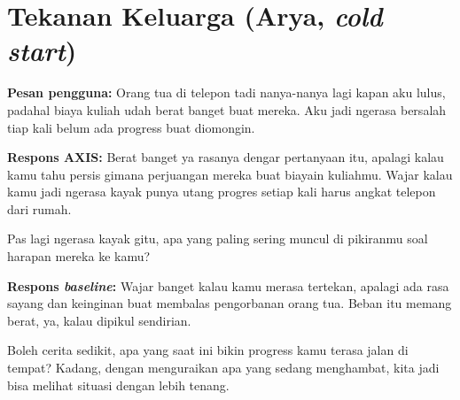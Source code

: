 \section{Tekanan Keluarga (Arya, \textit{cold start})}

\textbf{Pesan pengguna:} Orang tua di telepon tadi nanya-nanya lagi kapan aku lulus, padahal biaya kuliah udah berat banget buat mereka. Aku jadi ngerasa bersalah tiap kali belum ada progress buat diomongin.

\textbf{Respons AXIS:} Berat banget ya rasanya dengar pertanyaan itu, apalagi kalau kamu tahu persis gimana perjuangan mereka buat biayain kuliahmu. Wajar kalau kamu jadi ngerasa kayak punya utang progres setiap kali harus angkat telepon dari rumah.

Pas lagi ngerasa kayak gitu, apa yang paling sering muncul di pikiranmu soal harapan mereka ke kamu?

\textbf{Respons \textit{baseline}:} Wajar banget kalau kamu merasa tertekan, apalagi ada rasa sayang dan keinginan buat membalas pengorbanan orang tua. Beban itu memang berat, ya, kalau dipikul sendirian.

Boleh cerita sedikit, apa yang saat ini bikin progress kamu terasa jalan di tempat? Kadang, dengan menguraikan apa yang sedang menghambat, kita jadi bisa melihat situasi dengan lebih tenang.

